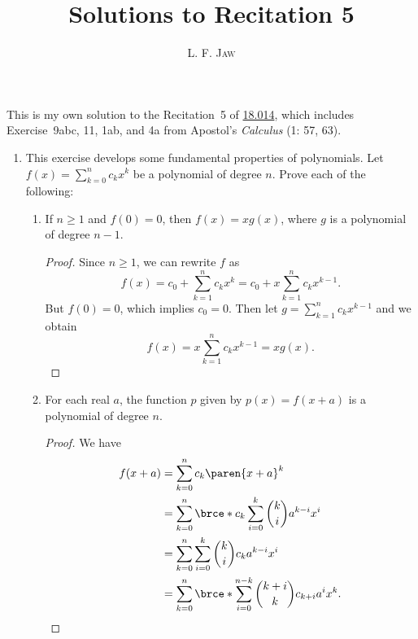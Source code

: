 \documentclass[a4paper]{article}
\title{Solutions to Recitation 5}
\author{L. F. \textsc{Jaw}}
\begin{document}
\maketitle

This is my own solution to the Recitation~5 of
\href{https://ocw.mit.edu/courses/mathematics/18-014-calculus-with-theory-fall-2010/recitations/}{18.014},
which includes Exercise~9abc, 11, 1ab, and 4a from Apostol's
\textit{Calculus} (1: 57, 63).

\begin{enumerate}
\item This exercise develops some fundamental properties of
  polynomials.  Let \(f(x) = \sum_{k=0}^n c_k x^k\) be a polynomial of
  degree \(n\).  Prove each of the following:
  \begin{enumerate}
  \item If \(n \ge 1\) and \(f(0) = 0\), then \(f(x) = xg(x)\), where
    \(g\) is a polynomial of degree \(n-1\).

    \begin{proof}
      Since \(n \ge 1\), we can rewrite \(f\) as
      \begin{displaymath}
        f(x) = c_0 + \sum_{k=1}^n c_k x^k = c_0 + x \sum_{k=1}^n c_k x^{k-1}.
      \end{displaymath}
      But \(f(0) = 0\), which implies \(c_0 = 0\).  Then let
      \(g = \sum_{k=1}^n c_k x^{k-1}\) and we obtain
      \begin{displaymath}
        f(x) = x \sum_{k=1}^n c_k x^{k-1} = xg(x).
      \end{displaymath}
    \end{proof}

  \item For each real \(a\), the function \(p\) given by
    \(p(x) = f(x+a)\) is a polynomial of degree \(n\).

    \begin{proof}
      We have
      \begin{align*}
        f(x+a) &= \sum_{k=0}^n c_k \paren{x+a}^k \\
               &= \sum_{k=0}^n \brce*{ c_k \sum_{i=0}^k \binom{k}{i} a^{k-i} x^i } \\
               &= \sum_{k=0}^n \sum_{i=0}^k \binom{k}{i} c_k a^{k-i} x^i \\
               &= \sum_{k=0}^n \brce*{ \sum_{i=0}^{n-k} \binom{k+i}{k} c_{k+i} a^{i} } x^k. \qedhere
      \end{align*}
    \end{proof}
  \end{enumerate}
\end{enumerate}
\end{document}
